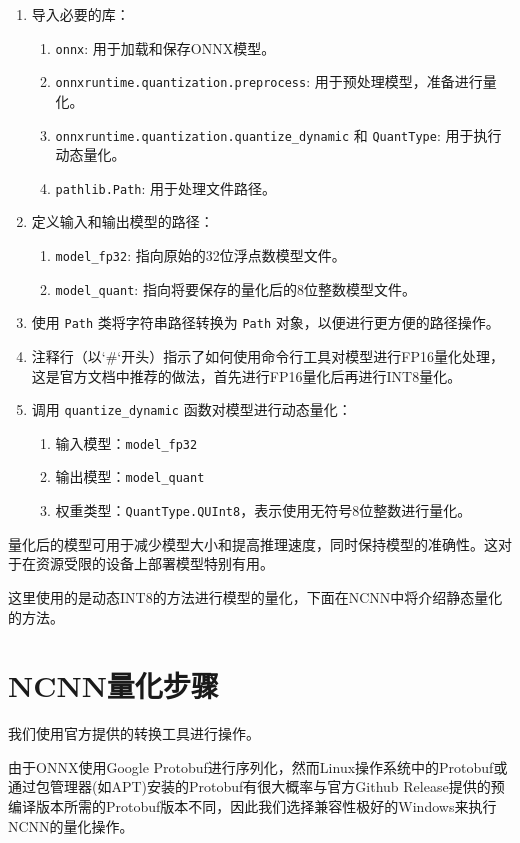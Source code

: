 \begin{enumerate}
	\item 导入必要的库：
	\begin{enumerate}
		\item \texttt{onnx}: 用于加载和保存ONNX模型。
		\item \texttt{onnxruntime.quantization.preprocess}: 用于预处理模型，准备进行量化。
		\item \texttt{onnxruntime.quantization.quantize\_dynamic} 和 \texttt{QuantType}: 用于执行动态量化。
		\item \texttt{pathlib.Path}: 用于处理文件路径。
	\end{enumerate}
	\item 定义输入和输出模型的路径：
	\begin{enumerate}
		\item \texttt{model\_fp32}: 指向原始的32位浮点数模型文件。
		\item \texttt{model\_quant}: 指向将要保存的量化后的8位整数模型文件。
	\end{enumerate}
	\item 使用 \texttt{Path} 类将字符串路径转换为 \texttt{Path} 对象，以便进行更方便的路径操作。
	\item 注释行（以`\#`开头）指示了如何使用命令行工具对模型进行FP16量化处理，这是官方文档中推荐的做法，首先进行FP16量化后再进行INT8量化。
	\item 调用 \texttt{quantize\_dynamic} 函数对模型进行动态量化：
	\begin{enumerate}
		\item 输入模型：\texttt{model\_fp32}
		\item 输出模型：\texttt{model\_quant}
		\item 权重类型：\texttt{QuantType.QUInt8}，表示使用无符号8位整数进行量化。
	\end{enumerate}
\end{enumerate}

量化后的模型可用于减少模型大小和提高推理速度，同时保持模型的准确性。这对于在资源受限的设备上部署模型特别有用。

这里使用的是动态INT8的方法进行模型的量化，下面在NCNN中将介绍静态量化的方法。

\section{NCNN量化步骤}

我们使用官方提供的转换工具进行操作。

由于ONNX使用Google Protobuf进行序列化，然而Linux操作系统中的Protobuf或通过包管理器(如APT)安装的Protobuf有很大概率与官方Github Release提供的预编译版本所需的Protobuf版本不同，因此我们选择兼容性极好的Windows来执行NCNN的量化操作。

